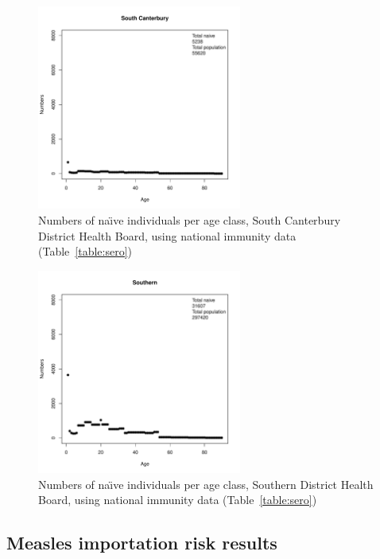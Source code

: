 \documentclass{article}
\begin{document}
\begin{itemize}
\begin{figure}[H]
     \begin{center}
     \includegraphics[width=0.6\textwidth]{dhb19.pdf}
     \end{center}
     \caption{Numbers of na\"{\i}ve individuals per age class, South Canterbury District Health Board, using national immunity data (Table~\ref{table:sero})}
     \label{fig:SouthCanterbury}
\end{figure}

\begin{figure}[H]
     \begin{center}
     \includegraphics[width=0.6\textwidth]{dhb20.pdf}
     \end{center}
     \caption{Numbers of na\"{\i}ve individuals per age class, Southern District Health Board, using national immunity data (Table~\ref{table:sero})}
     \label{fig:Southern}
\end{figure}

\subsection{Measles importation risk results}


\end{itemize}
\end{document}
